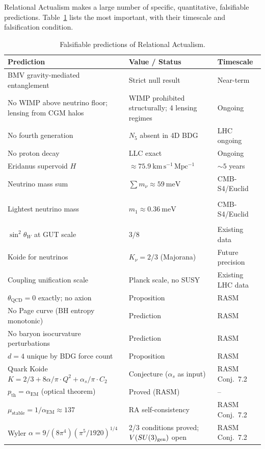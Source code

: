 \documentclass[11pt,a4paper]{article}
\begin{document}
Relational Actualism makes a large number of specific, quantitative,
falsifiable predictions. Table~\ref{tab:predictions} lists the most
important, with their timescale and falsification condition.

\begin{table}[ht]
\centering
\caption{Falsifiable predictions of Relational Actualism.}
\label{tab:predictions}
\renewcommand{\arraystretch}{1.3}
\begin{tabular}{p{5.2cm}p{4.5cm}p{3.5cm}}
\toprule
Prediction & Value / Status & Timescale \\
\midrule
BMV gravity-mediated entanglement & Strict null result & Near-term \\
No WIMP above neutrino floor; lensing from CGM halos & WIMP prohibited structurally; 4 lensing regimes & Ongoing \\
No fourth generation & $N_5$ absent in 4D BDG & LHC ongoing \\
No proton decay & LLC exact & Ongoing \\
Eridanus supervoid $H$ & $\approx 75.9~\mathrm{km\,s^{-1}\,Mpc^{-1}}$ & $\sim 5$ years \\
Neutrino mass sum & $\sum m_\nu \approx 59~\mathrm{meV}$ & CMB-S4/Euclid \\\\
Lightest neutrino mass & $m_1 \approx 0.36~\mathrm{meV}$ & CMB-S4/Euclid \\\\
$\sin^2\theta_W$ at GUT scale & $3/8$ & Existing data \\
Koide for neutrinos & $K_\nu = 2/3$ (Majorana) & Future precision \\
Coupling unification scale & Planck scale, no SUSY & Existing LHC data \\
$\theta_{\mathrm{QCD}} = 0$ exactly; no axion & Proposition & RASM \\
No Page curve (BH entropy monotonic) & Prediction & RASM \\
No baryon isocurvature perturbations & Prediction & RASM \\
$d = 4$ unique by BDG force count & Proposition & RASM \\
Quark Koide $K = 2/3 + 8\alpha/\pi\cdot Q^2 + \alpha_s/\pi\cdot C_2$ & Conjecture ($\alpha_s$ as input) & RASM Conj.~7.2 \\
$p_{\mathrm{th}} = \alpha_{\mathrm{EM}}$ (optical theorem) & Proved (RASM) & -- \\ $\mu_{\mathrm{stable}} = 1/\alpha_{\mathrm{EM}} \approx 137$ & RA self-consistency & RASM Conj.~7.2 \\ Wyler $\alpha = 9/(8\pi^4)(\pi^5/1920)^{1/4}$ & 2/3 conditions proved; $V(SU(3)_{\rm gen})$ open & RASM Conj.~7.2 \\

\end{tabular}
\end{table}
\end{document}
